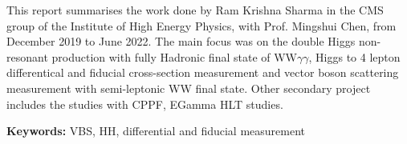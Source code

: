 \begin{resumen}

This report summarises the work done by Ram Krishna Sharma in the CMS group of the Institute of High Energy Physics, with Prof. Mingshui Chen, from December 2019 to June 2022. The main focus was on the double Higgs non-resonant production with fully Hadronic final state of WW$\gamma \gamma$, Higgs to 4 lepton differentical and fiducial cross-section measurement and vector boson scattering measurement with semi-leptonic WW final state. Other secondary project includes the studies with CPPF, EGamma HLT studies.

\vspace*{2em}

\noindent \textbf{Keywords:} {VBS, HH, differential and fiducial measurement}
\end{resumen}






